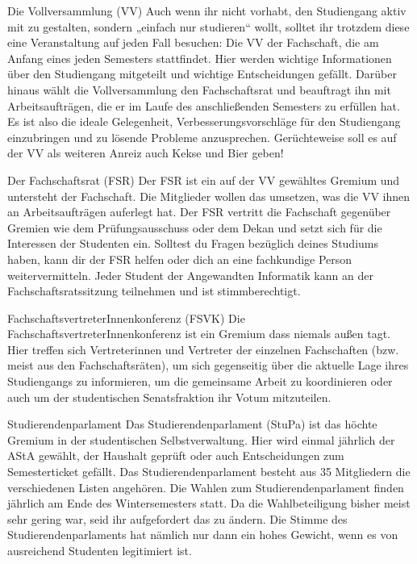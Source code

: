 Die Vollversammlung (VV)
Auch wenn ihr nicht vorhabt, den Studiengang aktiv mit zu gestalten, sondern „einfach nur studieren“ wollt, solltet ihr trotzdem diese eine Veranstaltung auf jeden Fall besuchen: Die VV der Fachschaft, die am Anfang eines jeden Semesters stattfindet. Hier werden wichtige Informationen über den Studiengang mitgeteilt und wichtige Entscheidungen gefällt. Darüber hinaus wählt die Vollversammlung den Fachschaftsrat und beauftragt ihn mit Arbeitsaufträgen, die er im Laufe des anschließenden Semesters zu erfüllen hat. Es ist also die ideale Gelegenheit, Verbesserungsvorschläge für den Studiengang einzubringen und zu lösende Probleme anzusprechen. Gerüchteweise soll es  auf der VV als weiteren Anreiz auch Kekse und Bier geben!

Der Fachschaftsrat (FSR)
Der FSR ist ein auf der VV gewähltes Gremium und untersteht der Fachschaft. Die Mitglieder wollen das umsetzen, was die VV ihnen an Arbeitsaufträgen auferlegt hat. Der FSR vertritt die Fachschaft gegenüber Gremien wie dem Prüfungsausschuss oder dem Dekan und setzt sich für die Interessen der Studenten ein. Solltest du Fragen bezüglich deines Studiums haben, kann dir der FSR helfen oder dich an eine fachkundige Person weitervermitteln. Jeder Student der Angewandten Informatik kann an der Fachschaftsratssitzung teilnehmen und ist stimmberechtigt.

FachschaftsvertreterInnenkonferenz (FSVK)
Die FachschaftsvertreterInnenkonferenz ist ein Gremium dass niemals außen tagt. Hier treffen sich Vertreterinnen und Vertreter der einzelnen Fachschaften (bzw. meist aus den Fachschaftsräten), um sich gegenseitig über die aktuelle Lage ihres Studiengangs zu informieren, um die gemeinsame Arbeit zu koordinieren oder auch um der studentischen Senatsfraktion ihr Votum mitzuteilen.

Studierendenparlament
Das Studierendenparlament (StuPa) ist das höchte Gremium in der studentischen Selbstverwaltung. Hier wird einmal jährlich der AStA gewählt, der Haushalt geprüft oder auch Entscheidungen zum Semesterticket gefällt. Das Studierendenparlament besteht aus 35 Mitgliedern die verschiedenen Listen angehören. Die Wahlen zum Studierendenparlament finden jährlich am Ende des Wintersemesters statt. Da die Wahlbeteiligung bisher meist sehr gering war, seid ihr aufgefordert das zu ändern. Die Stimme des Studierendenparlaments hat nämlich nur dann ein hohes Gewicht, wenn es von ausreichend Studenten legitimiert ist.

